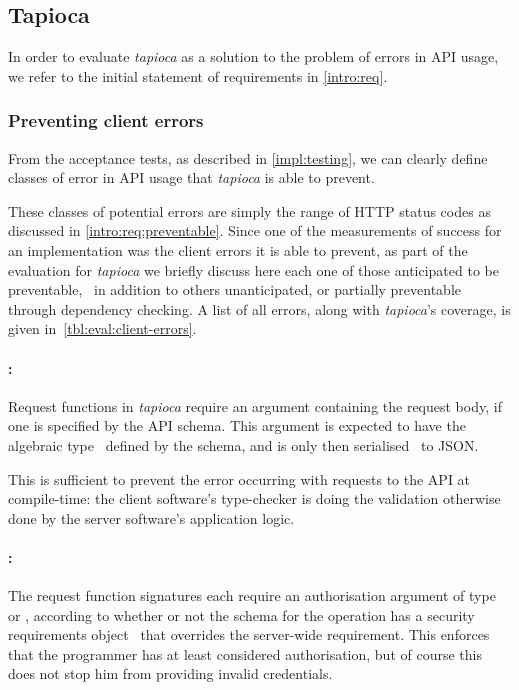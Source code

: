 \subsection{Tapioca} \label{eval:tapioca}

In order to evaluate \emph{tapioca} as a solution to the problem of errors in API usage, we refer to the initial statement of requirements in \ref{intro:req}.

\subsubsection{Preventing client errors} \label{eval:tapioca:prevent}

From the acceptance tests, as described in \cref{impl:testing}, we can clearly define classes of error in API usage that \emph{tapioca} is able to prevent.

These classes of potential errors are simply the  range of HTTP status codes as discussed in \cref{intro:req:preventable}. Since one of the measurements of success for an implementation was the client errors it is able to prevent, as part of the evaluation for \emph{tapioca} we briefly discuss here each one of those anticipated to be preventable,~ in addition to others unanticipated, or partially preventable through dependency checking. A list of all  errors, along with \emph{tapioca}'s coverage, is given in~\cref{tbl:eval:client-errors}.

\paragraph{:} Request functions in \emph{tapioca} require an argument containing the request body, if one is specified by the API schema. This argument is expected to have the algebraic type~ defined by the schema, and is only then serialised~\cite{serde} to JSON.

This is sufficient to prevent the error occurring with requests to the API at compile-time: the client software's type-checker is doing the validation otherwise done by the server software's application logic.

\paragraph{:} The request function signatures each require an authorisation argument of type  or , according to whether or not the schema for the operation has a security requirements object~\cite{oas_v3} that overrides the server-wide requirement. This enforces that the programmer has at least considered authorisation, but of course this does not stop him from providing invalid credentials.

